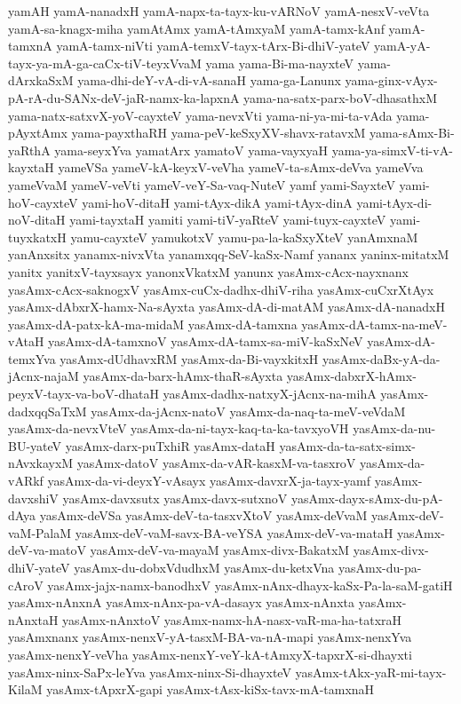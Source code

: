 {yamAH
yamA-nanadxH
yamA-napx-ta-tayx-ku-vARNoV
yamA-nesxV-veVta
yamA-sa-knagx-miha
yamAtAmx
yamA-tAmxyaM
yamA-tamx-kAnf
yamA-tamxnA
yamA-tamx-niVti
yamA-temxV-tayx-tArx-Bi-dhiV-yateV
yamA-yA-tayx-ya-mA-ga-caCx-tiV-teyxVvaM
yama
yama-Bi-ma-nayxteV
yama-dArxkaSxM
yama-dhi-deY-vA-di-vA-sanaH
yama-ga-Lanunx
yama-ginx-vAyx-pA-rA-du-SANx-deV-jaR-namx-ka-lapxnA
yama-na-satx-parx-boV-dhasathxM
yama-natx-satxvX-yoV-cayxteV
yama-nevxVti
yama-ni-ya-mi-ta-vAda
yama-pAyxtAmx
yama-payxthaRH
yama-peV-keSxyXV-shavx-ratavxM
yama-sAmx-Bi-yaRthA
yama-seyxYva
yamatArx
yamatoV
yama-vayxyaH
yama-ya-simxV-ti-vA-kayxtaH
yameVSa
yameV-kA-keyxV-veVha
yameV-ta-sAmx-deVva
yameVva
yameVvaM
yameV-veVti
yameV-veY-Sa-vaq-NuteV
yamf
yami-SayxteV
yami-hoV-cayxteV
yami-hoV-ditaH
yami-tAyx-dikA
yami-tAyx-dinA
yami-tAyx-di-noV-ditaH
yami-tayxtaH
yamiti
yami-tiV-yaRteV
yami-tuyx-cayxteV
yami-tuyxkatxH
yamu-cayxteV
yamukotxV
yamu-pa-la-kaSxyXteV
yanAmxnaM
yanAnxsitx
yanamx-nivxVta
yanamxqq-SeV-kaSx-Namf
yananx
yaninx-mitatxM
yanitx
yanitxV-tayxsayx
yanonxVkatxM
yanunx
yasAmx-cAcx-nayxnanx
yasAmx-cAcx-saknogxV
yasAmx-cuCx-dadhx-dhiV-riha
yasAmx-cuCxrXtAyx
yasAmx-dAbxrX-hamx-Na-sAyxta
yasAmx-dA-di-matAM
yasAmx-dA-nanadxH
yasAmx-dA-patx-kA-ma-midaM
yasAmx-dA-tamxna
yasAmx-dA-tamx-na-meV-vAtaH
yasAmx-dA-tamxnoV
yasAmx-dA-tamx-sa-miV-kaSxNeV
yasAmx-dA-temxYva
yasAmx-dUdhavxRM
yasAmx-da-Bi-vayxkitxH
yasAmx-daBx-yA-da-jAcnx-najaM
yasAmx-da-barx-hAmx-thaR-sAyxta
yasAmx-dabxrX-hAmx-peyxV-tayx-va-boV-dhataH
yasAmx-dadhx-natxyX-jAcnx-na-mihA
yasAmx-dadxqqSaTxM
yasAmx-da-jAcnx-natoV
yasAmx-da-naq-ta-meV-veVdaM
yasAmx-da-nevxVteV
yasAmx-da-ni-tayx-kaq-ta-ka-tavxyoVH
yasAmx-da-nu-BU-yateV
yasAmx-darx-puTxhiR
yasAmx-dataH
yasAmx-da-ta-satx-simx-nAvxkayxM
yasAmx-datoV
yasAmx-da-vAR-kasxM-va-tasxroV
yasAmx-da-vARkf
yasAmx-da-vi-deyxY-vAsayx
yasAmx-davxrX-ja-tayx-yamf
yasAmx-davxshiV
yasAmx-davxsutx
yasAmx-davx-sutxnoV
yasAmx-dayx-sAmx-du-pA-dAya
yasAmx-deVSa
yasAmx-deV-ta-tasxvXtoV
yasAmx-deVvaM
yasAmx-deV-vaM-PalaM
yasAmx-deV-vaM-savx-BA-veYSA
yasAmx-deV-va-mataH
yasAmx-deV-va-matoV
yasAmx-deV-va-mayaM
yasAmx-divx-BakatxM
yasAmx-divx-dhiV-yateV
yasAmx-du-dobxVdudhxM
yasAmx-du-ketxVna
yasAmx-du-pa-cAroV
yasAmx-jajx-namx-banodhxV
yasAmx-nAnx-dhayx-kaSx-Pa-la-saM-gatiH
yasAmx-nAnxnA
yasAmx-nAnx-pa-vA-dasayx
yasAmx-nAnxta
yasAmx-nAnxtaH
yasAmx-nAnxtoV
yasAmx-namx-hA-nasx-vaR-ma-ha-tatxraH
yasAmxnanx
yasAmx-nenxV-yA-tasxM-BA-va-nA-mapi
yasAmx-nenxYva
yasAmx-nenxY-veVha
yasAmx-nenxY-veY-kA-tAmxyX-tapxrX-si-dhayxti
yasAmx-ninx-SaPx-leYva
yasAmx-ninx-Si-dhayxteV
yasAmx-tAkx-yaR-mi-tayx-KilaM
yasAmx-tApxrX-gapi
yasAmx-tAsx-kiSx-tavx-mA-tamxnaH
}
